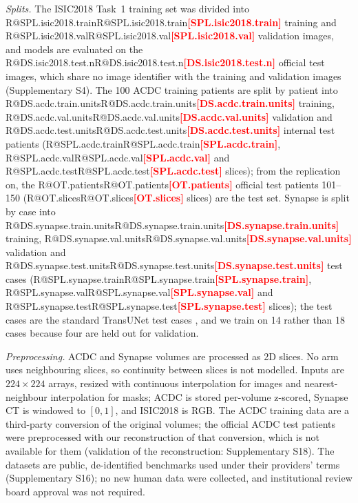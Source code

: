 \documentclass[fleqn,10pt,lineno]{wlpeerj}
\makeatletter
\newcommand{\R}[1]{\ifcsname R@#1\endcsname\csname R@#1\endcsname\else\textbf{\textcolor{red}{[#1]}}\fi}
\makeatother
\begin{document}
\emph{Splits.} The ISIC2018 Task~1 training set was divided into \R{SPL.isic2018.train} training and \R{SPL.isic2018.val} validation images, and models are evaluated on the \R{DS.isic2018.test.n} official test images, which share no image identifier with the training and validation images (Supplementary S4). The 100 ACDC training patients are split by patient into \R{DS.acdc.train.units} training, \R{DS.acdc.val.units} validation and \R{DS.acdc.test.units} internal test patients (\R{SPL.acdc.train}, \R{SPL.acdc.val} and \R{SPL.acdc.test} slices); from the replication on, the \R{OT.patients} official test patients 101--150 (\R{OT.slices} slices) are the test set. Synapse is split by case into \R{DS.synapse.train.units} training, \R{DS.synapse.val.units} validation and \R{DS.synapse.test.units} test cases (\R{SPL.synapse.train}, \R{SPL.synapse.val} and \R{SPL.synapse.test} slices); the test cases are the standard TransUNet test cases \citep{Chen2021TransUNetArxiv}, and we train on 14 rather than 18 cases because four are held out for validation.

\emph{Preprocessing.} ACDC and Synapse volumes are processed as 2D slices. No arm uses neighbouring slices, so continuity between slices is not modelled. Inputs are $224\times224$ arrays, resized with continuous interpolation for images and nearest-neighbour interpolation for masks; ACDC is stored per-volume z-scored, Synapse CT is windowed to $[0,1]$, and ISIC2018 is RGB. The ACDC training data are a third-party conversion of the original volumes; the official ACDC test patients were preprocessed with our reconstruction of that conversion, which is not available for them (validation of the reconstruction: Supplementary S18). The datasets are public, de-identified benchmarks used under their providers' terms (Supplementary S16); no new human data were collected, and institutional review board approval was not required.
\end{document}
